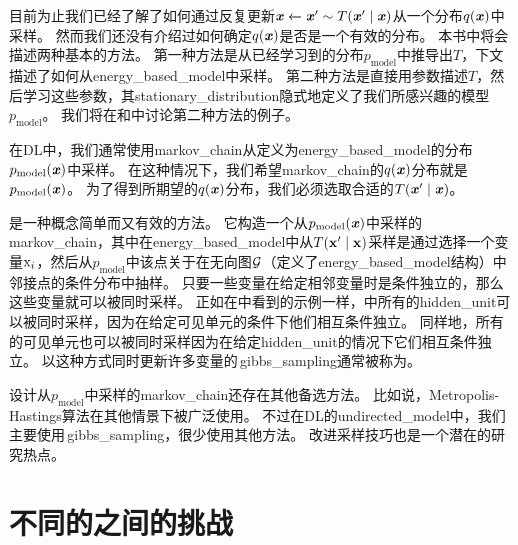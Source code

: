 目前为止我们已经了解了如何通过反复更新$\boldsymbol{\mathit{x}} \xleftarrow{} \boldsymbol{\mathit{x}}'\sim T(\boldsymbol{\mathit{x}}'\mid\boldsymbol{\mathit{x}})$从一个分布$q(\boldsymbol{\mathit{x}})$中采样。 
然而我们还没有介绍过如何确定$q(\boldsymbol{\mathit{x}})$是否是一个有效的分布。
本书中将会描述两种基本的方法。  
第一种方法是从已经学习到的分布$p_{\text{model}}$中推导出$T$，下文描述了如何从\gls{energy_based_model}中采样。
第二种方法是直接用参数描述$T$，然后学习这些参数，其\gls{stationary_distribution}隐式地定义了我们所感兴趣的模型$p_{\text{model}}$。
我们将在和中讨论第二种方法的例子。  


在\gls{DL}中，我们通常使用\gls{markov_chain}从定义为\gls{energy_based_model}的分布$p_{\text{model}}(\boldsymbol{\mathit{x}})$中采样。
在这种情况下，我们希望\gls{markov_chain}的$q(\boldsymbol{\mathit{x}})$分布就是$p_{\text{model}}(\boldsymbol{\mathit{x}})$。
为了得到所期望的$q(\boldsymbol{\mathit{x}})$分布，我们必须选取合适的$T(\boldsymbol{\mathit{x}}'\mid \boldsymbol{\mathit{x}})$。


是一种概念简单而又有效的方法。
它构造一个从$p_{\text{model}}(\boldsymbol{\mathit{x}})$中采样的\gls{markov_chain}，其中在\gls{energy_based_model}中从$T(\mathbf{x}'\mid \mathbf{x})$采样是通过选择一个变量$\mathrm{x}_i$，然后从$p_{\text{model}}$中该点关于在无向图$\mathcal{G}$（定义了\gls{energy_based_model}结构）中邻接点的条件分布中抽样。
只要一些变量在给定相邻变量时是条件独立的，那么这些变量就可以被同时采样。
正如在中看到的示例一样，中所有的\gls{hidden_unit}可以被同时采样，因为在给定可见单元的条件下他们相互条件独立。
同样地，所有的可见单元也可以被同时采样因为在给定\gls{hidden_unit}的情况下它们相互条件独立。 
以这种方式同时更新许多变量的\,\gls{gibbs_sampling}通常被称为。   

设计从$p_{\text{model}}$中采样的\gls{markov_chain}还存在其他备选方法。  
比如说，Metropolis-Hastings算法在其他情景下被广泛使用。
不过在\gls{DL}的\gls{undirected_model}中，我们主要使用\,\gls{gibbs_sampling}，很少使用其他方法。 
改进采样技巧也是一个潜在的研究热点。


\section{不同的之间的挑战}
\label{sec:the_challenge_of_mixing_between_separated_modes}


